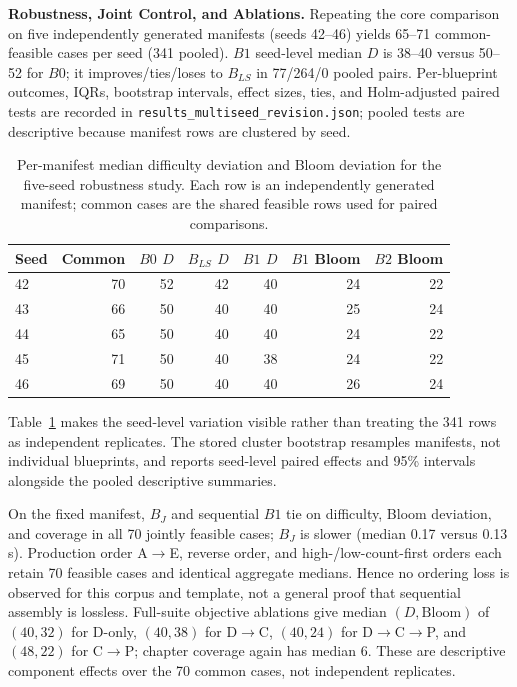 \documentclass[runningheads]{llncs}
\begin{document}
\noindent\textbf{Robustness, Joint Control, and Ablations.} Repeating the core comparison on five independently generated manifests (seeds 42--46) yields 65--71 common-feasible cases per seed (341 pooled). $B1$ seed-level median $D$ is 38--40 versus 50--52 for $B0$; it improves/ties/loses to $B_{LS}$ in 77/264/0 pooled pairs. Per-blueprint outcomes, IQRs, bootstrap intervals, effect sizes, ties, and Holm-adjusted paired tests are recorded in \texttt{results\_multiseed\_revision.json}; pooled tests are descriptive because manifest rows are clustered by seed.

\begin{table}[t]
\caption{Per-manifest median difficulty deviation and Bloom deviation for the five-seed robustness study. Each row is an independently generated manifest; common cases are the shared feasible rows used for paired comparisons.}
\label{tab:seedresults}
\centering\scriptsize
\begin{tabular}{lrrrrrr}
\toprule
Seed & Common & $B0$ $D$ & $B_{LS}$ $D$ & $B1$ $D$ & $B1$ Bloom & $B2$ Bloom\\
\midrule
42 & 70 & 52 & 42 & 40 & 24 & 22\\
43 & 66 & 50 & 40 & 40 & 25 & 24\\
44 & 65 & 50 & 40 & 40 & 24 & 22\\
45 & 71 & 50 & 40 & 38 & 24 & 22\\
46 & 69 & 50 & 40 & 40 & 26 & 24\\
\bottomrule
\end{tabular}
\end{table}

Table~\ref{tab:seedresults} makes the seed-level variation visible rather than treating the 341 rows as independent replicates. The stored cluster bootstrap resamples manifests, not individual blueprints, and reports seed-level paired effects and 95\% intervals alongside the pooled descriptive summaries.

On the fixed manifest, $B_J$ and sequential $B1$ tie on difficulty, Bloom deviation, and coverage in all 70 jointly feasible cases; $B_J$ is slower (median 0.17 versus 0.13\,s). Production order A$\to$E, reverse order, and high-/low-count-first orders each retain 70 feasible cases and identical aggregate medians. Hence no ordering loss is observed for this corpus and template, not a general proof that sequential assembly is lossless. Full-suite objective ablations give median $(D,\mathrm{Bloom})$ of $(40,32)$ for D-only, $(40,38)$ for D$\to$C, $(40,24)$ for D$\to$C$\to$P, and $(48,22)$ for C$\to$P; chapter coverage again has median 6. These are descriptive component effects over the 70 common cases, not independent replicates.
\end{document}
